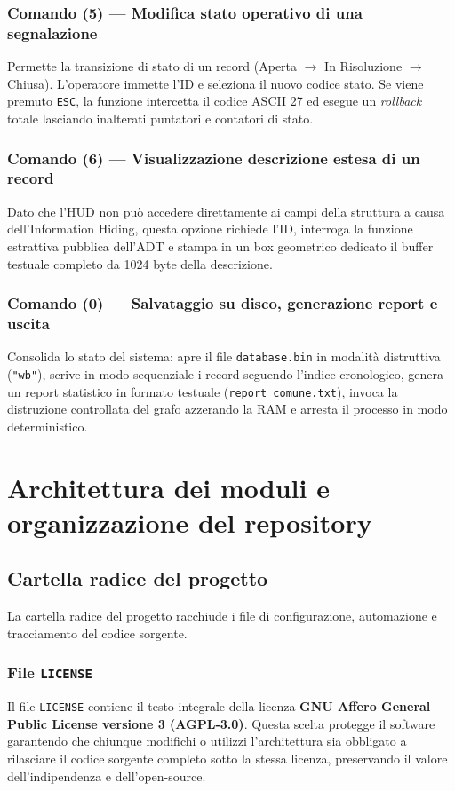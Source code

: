\documentclass[12pt, a4paper]{article}
\begin{document}
\subsubsection{Comando (5) --- Modifica stato operativo di una segnalazione}
Permette la transizione di stato di un record (Aperta $\rightarrow$ In Risoluzione $\rightarrow$ Chiusa). L'operatore immette l'ID e seleziona il nuovo codice stato. Se viene premuto \texttt{ESC}, la funzione intercetta il codice ASCII 27 ed esegue un \textit{rollback} totale lasciando inalterati puntatori e contatori di stato.

\subsubsection{Comando (6) --- Visualizzazione descrizione estesa di un record}
Dato che l'HUD non può accedere direttamente ai campi della struttura a causa dell'Information Hiding, questa opzione richiede l'ID, interroga la funzione estrattiva pubblica dell'ADT e stampa in un box geometrico dedicato il buffer testuale completo da 1024 byte della descrizione.

\subsubsection{Comando (0) --- Salvataggio su disco, generazione report e uscita}
Consolida lo stato del sistema: apre il file \texttt{database.bin} in modalità distruttiva (\texttt{"wb"}), scrive in modo sequenziale i record seguendo l'indice cronologico, genera un report statistico in formato testuale (\texttt{report\_comune.txt}), invoca la distruzione controllata del grafo azzerando la RAM e arresta il processo in modo deterministico.

\newpage

\section{Architettura dei moduli e organizzazione del repository}

\subsection{Cartella radice del progetto}
La cartella radice del progetto racchiude i file di configurazione, automazione e tracciamento del codice sorgente.

\subsubsection{File \texttt{LICENSE}}
Il file \texttt{LICENSE} contiene il testo integrale della licenza \textbf{GNU Affero General Public License versione 3 (AGPL-3.0)}. Questa scelta protegge il software garantendo che chiunque modifichi o utilizzi l'architettura sia obbligato a rilasciare il codice sorgente completo sotto la stessa licenza, preservando il valore dell'indipendenza e dell'open-source.
\end{document}
